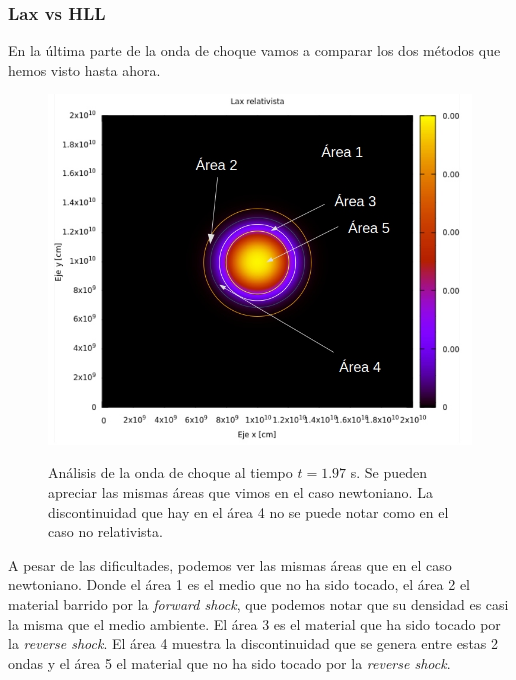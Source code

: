 \documentclass[12pt,a4paper]{book}
\begin{document}
\subsubsection{Lax vs HLL}
En la última parte de la onda de choque vamos a comparar los dos métodos que hemos visto hasta ahora.


\begin{figure}[H] \label{fig:analisis_onda_relativista_lax1}
\centering
{\includegraphics[scale=0.5]{./Figuras/Pruebas/Prueba_onda_choque/Lax-HLL-rel/bwlax-rel79-analisis}}
\caption{Análisis de la onda de choque al tiempo $t = 1.97$ s. Se pueden apreciar las mismas áreas que vimos en el caso newtoniano. La discontinuidad que hay en el área 4 no se puede notar como en el caso no relativista.}
\end{figure}

A pesar de las dificultades, podemos ver las mismas áreas que en el caso newtoniano. Donde el área 1 es el medio que no ha sido tocado, el área 2 el material barrido por la \emph{forward shock}, que podemos notar que su densidad es casi la misma que el medio ambiente. El área 3 es el material que ha sido tocado por la \emph{reverse shock}. El área 4 muestra la discontinuidad que se genera entre estas 2 ondas y el área 5 el material que no ha sido tocado por la \emph{reverse shock}.
\end{document}
